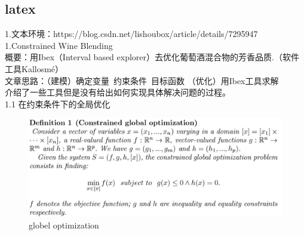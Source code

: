 \documentclass[UTF8]{ctexart}
\begin{document}
\subsection{latex}
1.文本环境：https://blog.csdn.net/lishoubox/article/details/7295947\\
1.Constrained Wine Blending\\
概要：用Ibex（Interval based explorer）去优化葡萄酒混合物的芳香品质.（软件工具Kallosmé）\\
文章思路：（建模）确定变量~约束条件~目标函数   （优化）用Ibex工具求解\\
介绍了一些工具但是没有给出如何实现具体解决问题的过程。\\
1.1 在约束条件下的全局优化 \\
\begin{figure}
  \includegraphics[width=.8\linewidth]{globelop.JPG}
  \caption{globel optimization}
  \label{fig:boat1}
\end{figure}
\end{document}
